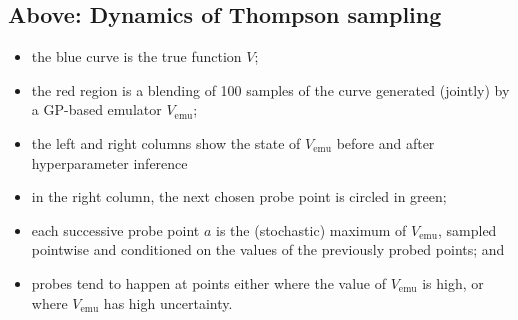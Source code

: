 \documentclass[a0,portrait]{a0poster}
\newcommand{\emu}{{\textrm{emu}}}
\begin{document}
\begin{multicols}{3}
\subsection*{Above: Dynamics of Thompson sampling}
\begin{itemize}
 \item the blue curve is the true function $V$;
 \item the red region is a blending of 100 samples of the curve generated (jointly) by a GP-based emulator $V_\emu$;
 \item  the left and right columns show the state of $V_\emu$ before and after hyperparameter inference
 \item in the right column, the next chosen probe point is circled in green;
 \item each successive probe point $a$ is the (stochastic) maximum of $V_\emu$, sampled pointwise and conditioned on the values of the previously probed points; and
 \item probes tend to happen at points either where the value of $V_\emu$ is high, or where $V_\emu$ has high uncertainty.
\end{itemize}

     
     
%

   




\color{DarkSlateGray} %



\end{multicols}
\end{document}
